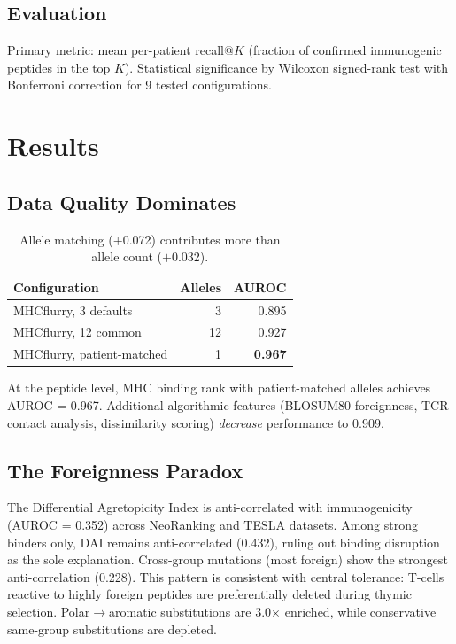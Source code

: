 \documentclass[11pt,twocolumn]{article}
\begin{document}
\subsection{Evaluation}

Primary metric: mean per-patient recall@$K$ (fraction of confirmed immunogenic peptides in the top $K$). Statistical significance by Wilcoxon signed-rank test with Bonferroni correction for 9 tested configurations.

\section{Results}

\subsection{Data Quality Dominates}

\begin{table}[ht]
\centering
\footnotesize
\begin{tabular}{@{}lrr@{}}
\toprule
Configuration & Alleles & AUROC \\
\midrule
MHCflurry, 3 defaults & 3 & 0.895 \\
MHCflurry, 12 common & 12 & 0.927 \\
MHCflurry, patient-matched & 1 & \textbf{0.967} \\
\bottomrule
\end{tabular}
\caption{Allele matching ($+$0.072) contributes more than allele count ($+$0.032).}
\end{table}

At the peptide level, MHC binding rank with patient-matched alleles achieves AUROC = 0.967. Additional algorithmic features (BLOSUM80 foreignness, TCR contact analysis, dissimilarity scoring) \textit{decrease} performance to 0.909.

\subsection{The Foreignness Paradox}

The Differential Agretopicity Index is anti-correlated with immunogenicity (AUROC = 0.352) across NeoRanking and TESLA datasets. Among strong binders only, DAI remains anti-correlated (0.432), ruling out binding disruption as the sole explanation. Cross-group mutations (most foreign) show the strongest anti-correlation (0.228). This pattern is consistent with central tolerance: T-cells reactive to highly foreign peptides are preferentially deleted during thymic selection. Polar$\to$aromatic substitutions are 3.0$\times$ enriched, while conservative same-group substitutions are depleted.
\end{document}
